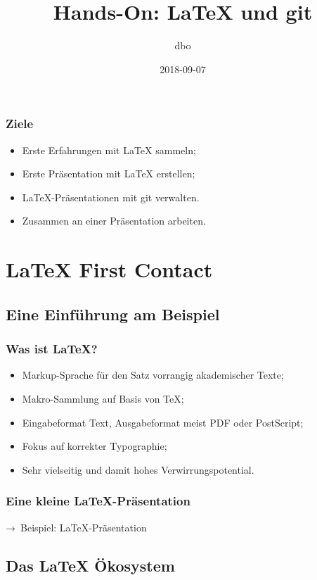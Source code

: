 \documentclass{cms-kurs}
\title{Hands-On: \LaTeX{} und git}
\author{dbo}
\date{2018-09-07}
\begin{document}
\begin{frame}
  \frametitle{Ziele}

  \onslide<+->

  \begin{itemize}
  \item Erste Erfahrungen mit \LaTeX{} sammeln;
  \item Erste Präsentation mit \LaTeX{} erstellen;
  \item \LaTeX{}-Präsentationen mit git verwalten.
  \item Zusammen an einer Präsentation arbeiten.
  \end{itemize}

\end{frame}

\section{\LaTeX{} First Contact}

\subsection{Eine Einführung am Beispiel}

\begin{frame}
  \frametitle{Was ist \LaTeX?}

  \onslide<+->

  \begin{itemize}
  \item Markup-Sprache für den Satz vorrangig akademischer Texte;
  \item Makro-Sammlung auf Basis von \TeX{};
  \item Eingabeformat Text, Ausgabeformat meist PDF oder PostScript;
  \item Fokus auf korrekter Typographie;
  \item Sehr vielseitig und damit hohes Verwirrungspotential.
  \end{itemize}

\end{frame}

\begin{frame}
  \frametitle{Eine kleine \LaTeX-Präsentation}

  \onslide<+->

  → Beispiel: \LaTeX{}-Präsentation

\end{frame}

\subsection{Das \LaTeX{} Ökosystem}
\end{document}
